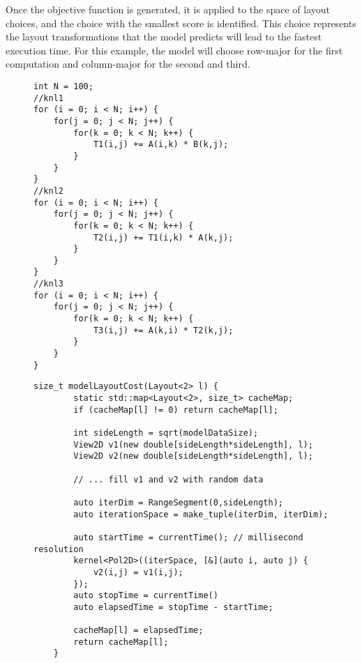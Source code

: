 Once the objective function is generated, it is applied to the space of layout choices, and the choice with the smallest score is identified.
This choice represents the layout transformations that the model predicts will lead to the fastest execution time.
For this example, the model will choose row-major for the first computation and column-major for the second and third.

\begin{figure}
\begin{lstlisting}[caption={Example loop chain. The selection problem targets the \texttt{A} array. Code is shown using standard C++ for loops rather than RAJA kernels for the reader's familiarity.},label=SelectionExampleCode]
int N = 100;
//knl1
for (i = 0; i < N; i++) {
	for(j = 0; j < N; j++) {
		for(k = 0; k < N; k++) {
			T1(i,j) += A(i,k) * B(k,j);
		}
	}
}
//knl2
for (i = 0; i < N; i++) {
	for(j = 0; j < N; j++) {
		for(k = 0; k < N; k++) {
			T2(i,j) += T1(i,k) * A(k,j);
		}
	}
}
//knl3
for (i = 0; i < N; i++) {
	for(j = 0; j < N; j++) {
		for(k = 0; k < N; k++) {
			T3(i,j) += A(k,i) * T2(k,j);
		}
	}
}

\end{lstlisting}
\end{figure}

\begin{figure}
	\begin{lstlisting}[caption={Microbenchmarking function for determining objective function cost coefficients. Code is shown for two-dimensional case for clarity. Note that the size of the data in the timed kernel does not change based on the size of the loops being modeled.},label=MicrobenchmarkingCode]
	size_t modelLayoutCost(Layout<2> l) {
		static std::map<Layout<2>, size_t> cacheMap;
		if (cacheMap[l] != 0) return cacheMap[l];

		int sideLength = sqrt(modelDataSize);
		View2D v1(new double[sideLength*sideLength], l);
		View2D v2(new double[sideLength*sideLength], l);

		// ... fill v1 and v2 with random data

		auto iterDim = RangeSegment(0,sideLength);
		auto iterationSpace = make_tuple(iterDim, iterDim);

		auto startTime = currentTime(); // millisecond resolution
		kernel<Pol2D>((iterSpace, [&](auto i, auto j) {
			v2(i,j) = v1(i,j);
		});
		auto stopTime = currentTime()
		auto elapsedTime = stopTime - startTime;

		cacheMap[l] = elapsedTime;
		return cacheMap[l];
	}
	
	\end{lstlisting}
\end{figure}

